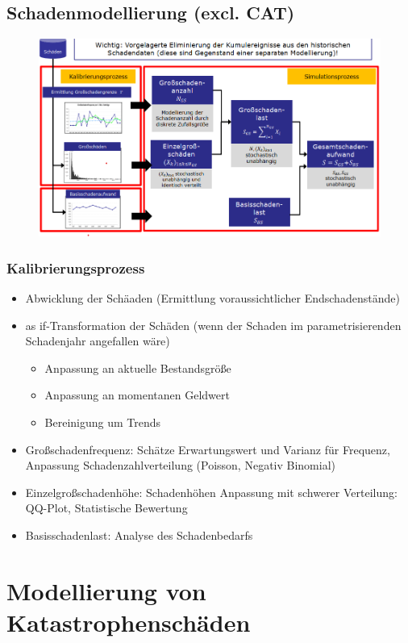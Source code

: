 \documentclass[12pt]{report}
\theoremstyle{dotless}
\theoremstyle{definition}
\begin{document}
\subsection{Schadenmodellierung (excl. CAT)}

\begin{figure}[ht]
	\centering
	\includegraphics[width= \textwidth]{Bilder/Folie27.png}
\end{figure}

\subsubsection{Kalibrierungsprozess}
\begin{itemize}
\item Abwicklung der Schäaden (Ermittlung voraussichtlicher Endschadenstände)
\item as if-Transformation der Schäden (wenn der Schaden im parametrisierenden Schadenjahr angefallen wäre)
\begin{itemize}
\item Anpassung an aktuelle Bestandsgröße
\item Anpassung an momentanen Geldwert
\item Bereinigung um Trends
\end{itemize}
\item Großschadenfrequenz: Schätze Erwartungswert und Varianz für Frequenz, Anpassung Schadenzahlverteilung (Poisson, Negativ Binomial)
\item Einzelgroßschadenhöhe: Schadenhöhen Anpassung mit schwerer Verteilung: QQ-Plot, Statistische Bewertung
\item Basisschadenlast: Analyse des Schadenbedarfs
\end{itemize}


\section{Modellierung von Katastrophenschäden}
\end{document}
